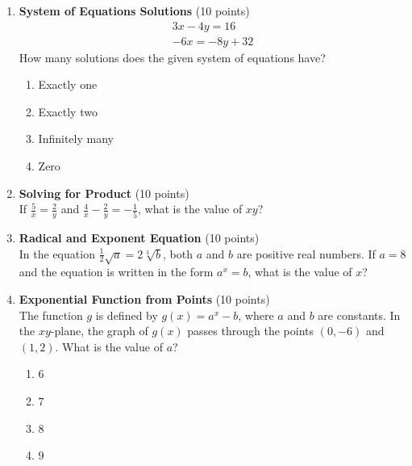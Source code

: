 \begin{enumerate}
  \item \textbf{System of Equations Solutions} (10 points)\\
  \[
    \begin{gathered}
    3x-4y=16 \\
    -6x=-8y+32
    \end{gathered}
  \]
  How many solutions does the given system of equations have?
  \begin{enumerate}[label=\Alph*.]
    \item Exactly one
    \item Exactly two
    \item Infinitely many
    \item Zero
  \end{enumerate}
  \begin{subanswer}
  \end{subanswer}

  \item \textbf{Solving for Product} (10 points)\\
  If $\frac{5}{x}=\frac{2}{y}$ and $\frac{4}{x}-\frac{2}{y}=-\frac{1}{5}$, what is the value of $xy$?
  \begin{subanswer}
  \end{subanswer}

  \item \textbf{Radical and Exponent Equation} (10 points)\\
  In the equation $\frac{1}{2} \sqrt{a}=2 \sqrt[3]{b}$, both $a$ and $b$ are positive real numbers. If $a=8$ and the equation is written in the form $a^x=b$, what is the value of $x$?
  \begin{subanswer}
  \end{subanswer}

  \item \textbf{Exponential Function from Points} (10 points)\\
  The function $g$ is defined by $g(x)=a^x-b$, where $a$ and $b$ are constants. In the $xy$-plane, the graph of $g(x)$ passes through the points $(0,-6)$ and $(1,2)$. What is the value of $a$?
  \begin{enumerate}[label=\Alph*.]
    \item $6$
    \item $7$
    \item $8$
    \item $9$
  \end{enumerate}
  \begin{subanswer}
  \end{subanswer}


\end{enumerate}
